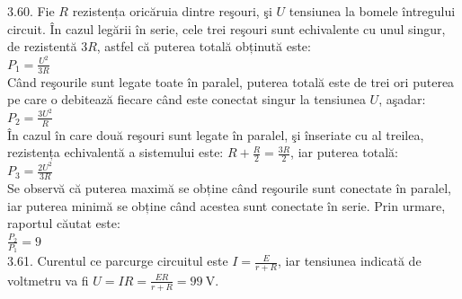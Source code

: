 3.60. Fie $R$ rezistența oricăruia dintre reşouri, şi $U$ tensiunea la bomele întregului circuit. În cazul legării în serie, cele trei reşouri sunt echivalente cu unul singur, de rezistentă $3 R$, astfel că puterea totală obținută este:\\ $P_{1}=\frac{U^{2}}{3 R}$\\ Când reşourile sunt legate toate în paralel, puterea totală este de trei ori puterea pe care o debitează fiecare când este conectat singur la tensiunea $U$, aşadar:\\ $P_{2}=\frac{3 U^{2}}{R}$\\ În cazul în care două reşouri sunt legate în paralel, şi înseriate cu al treilea, rezistența echivalentă a sistemului este: $R+\frac{R}{2}=\frac{3 R}{2}$, iar puterea totală:\\ $P_{3}=\frac{2 U^{2}}{3 R}$\\ Se observă că puterea maximă se obține când reşourile sunt conectate în paralel, iar puterea minimă se obține când acestea sunt conectate în serie. Prin urmare, raportul căutat este:\\ $\frac{P_{2}}{P_{1}}=9$\\

3.61. Curentul ce parcurge circuitul este $I=\frac{E}{r+R}$, iar tensiunea indicată de voltmetru va fi $U=I R=\frac{E R}{r+R}=99 \mathrm{~V}$.\\

